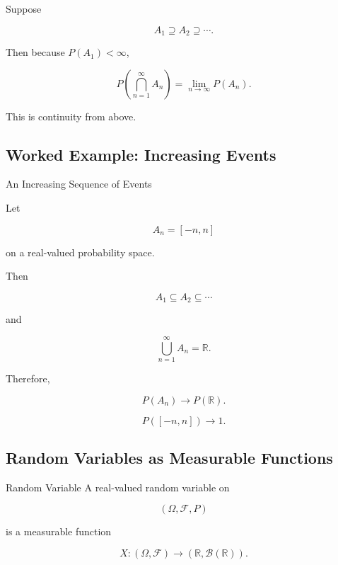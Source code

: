 Suppose

\[
A_1\supseteq A_2\supseteq\cdots.
\]

Then because \(P(A_1)<\infty\),

\[
\boxed{
P
\left(
\bigcap_{n=1}^{\infty}A_n
\right)
=
\lim_{n\to\infty}P(A_n).
}
\]

This is continuity from above.

\subsection{Worked Example: Increasing Events}
\label{subsec:worked-increasing-events}

\begin{workedexamplebox}{An Increasing Sequence of Events}

Let

\[
A_n
=
\left[
-\!n,n
\right]
\]

on a real-valued probability space.

Then

\[
A_1\subseteq A_2\subseteq\cdots
\]

and

\[
\bigcup_{n=1}^{\infty}A_n
=
\mathbb{R}.
\]

Therefore,

\[
P(A_n)\to P(\mathbb{R}).
\]

\begin{answerbox}
\[
\boxed{
P([-n,n])\to1.
}
\]
\end{answerbox}

\end{workedexamplebox}

\subsection{Random Variables as Measurable Functions}
\label{subsec:random-variables-measurable-functions}

\begin{definitionbox}{Random Variable}
A real-valued random variable on

\[
(\Omega,\mathcal{F},P)
\]

is a measurable function

\[
\boxed{
X:
(\Omega,\mathcal{F})
\to
(\mathbb{R},\mathcal{B}(\mathbb{R})).
}
\]
\end{definitionbox}

